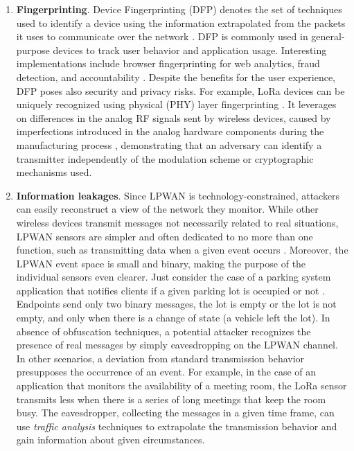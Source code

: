 \begin{enumerate}
	\item\textbf{Fingerprinting}. Device Fingerprinting (DFP) denotes the set of techniques used to identify a device using the information extrapolated from the packets it uses to communicate over the network \cite{Gu2018}. DFP is commonly used in general-purpose devices to track user behavior and application usage. Interesting implementations include browser fingerprinting for web analytics, fraud detection, and accountability \cite{28180002818032}. Despite the benefits for the user experience, DFP poses also security and privacy risks. For example, LoRa devices can be uniquely recognized using physical (PHY) layer fingerprinting \cite{inproceedings}. It leverages on differences in the analog RF signals sent by wireless devices, caused by imperfections introduced in the analog hardware components during the manufacturing process \cite{10.1145/1409944.1409959}, demonstrating that an adversary can identify a transmitter independently of the modulation scheme or cryptographic mechanisms used.

	\item \textbf{Information leakages}. Since LPWAN is technology-constrained, attackers can easily reconstruct a view of the network they monitor. While other wireless devices transmit messages not necessarily related to real situations, LPWAN sensors are simpler and often dedicated to no more than one function, such as transmitting data when a given event occurs \cite{information_leakage}. Moreover, the LPWAN event space is small and binary, making the purpose of the individual sensors even clearer. Just consider the case of a parking system application that notifies clients if a given parking lot is occupied or not \cite{app10134674}. Endpoints send only two binary messages, the lot is empty or the lot is not empty, and only when there is a change of state (a vehicle left the lot). In absence of obfuscation techniques, a potential attacker recognizes the presence of real messages by simply eavesdropping on the LPWAN channel.
\\
In other scenarios, a deviation from standard transmission behavior presupposes the occurrence of an event. For example, in the case of an application that monitors the availability of a meeting room, the LoRa sensor transmits less when there is a series of long meetings that keep the room busy. The eavesdropper, collecting the messages in a given time frame, can use \textit{traffic analysis} techniques to extrapolate the transmission behavior and gain information about given circumstances.
\end{enumerate}

